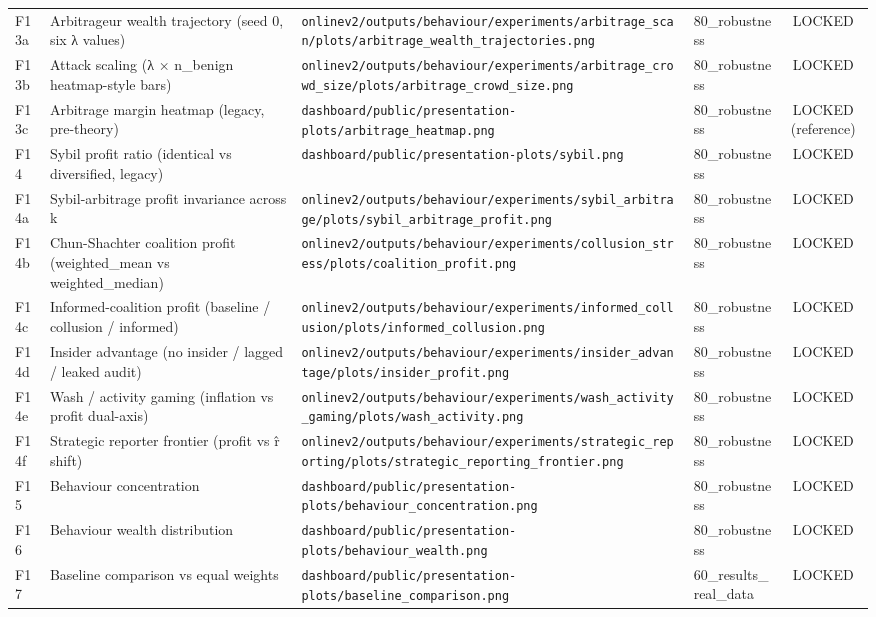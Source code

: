 \documentclass[11pt,a4paper,openany]{report}
\begin{document}
\begin{center}
\begin{tabular}{llllc}
F13a & Arbitrageur wealth trajectory (seed 0, six λ values) & \texttt{onlinev2/outputs/behaviour/experiments/arbitrage\_scan/plots/arbitrage\_wealth\_trajectories.png} & 80\_robustness & LOCKED \\
F13b & Attack scaling (λ × n\_benign heatmap-style bars) & \texttt{onlinev2/outputs/behaviour/experiments/arbitrage\_crowd\_size/plots/arbitrage\_crowd\_size.png} & 80\_robustness & LOCKED \\
F13c & Arbitrage margin heatmap (legacy, pre-theory) & \texttt{dashboard/public/presentation-plots/arbitrage\_heatmap.png} & 80\_robustness & LOCKED (reference) \\
F14 & Sybil profit ratio (identical vs diversified, legacy) & \texttt{dashboard/public/presentation-plots/sybil.png} & 80\_robustness & LOCKED \\
F14a & Sybil-arbitrage profit invariance across k & \texttt{onlinev2/outputs/behaviour/experiments/sybil\_arbitrage/plots/sybil\_arbitrage\_profit.png} & 80\_robustness & LOCKED \\
F14b & Chun-Shachter coalition profit (weighted\_mean vs weighted\_median) & \texttt{onlinev2/outputs/behaviour/experiments/collusion\_stress/plots/coalition\_profit.png} & 80\_robustness & LOCKED \\
F14c & Informed-coalition profit (baseline / collusion / informed) & \texttt{onlinev2/outputs/behaviour/experiments/informed\_collusion/plots/informed\_collusion.png} & 80\_robustness & LOCKED \\
F14d & Insider advantage (no insider / lagged / leaked audit) & \texttt{onlinev2/outputs/behaviour/experiments/insider\_advantage/plots/insider\_profit.png} & 80\_robustness & LOCKED \\
F14e & Wash / activity gaming (inflation vs profit dual-axis) & \texttt{onlinev2/outputs/behaviour/experiments/wash\_activity\_gaming/plots/wash\_activity.png} & 80\_robustness & LOCKED \\
F14f & Strategic reporter frontier (profit vs r̂ shift) & \texttt{onlinev2/outputs/behaviour/experiments/strategic\_reporting/plots/strategic\_reporting\_frontier.png} & 80\_robustness & LOCKED \\
F15 & Behaviour concentration & \texttt{dashboard/public/presentation-plots/behaviour\_concentration.png} & 80\_robustness & LOCKED \\
F16 & Behaviour wealth distribution & \texttt{dashboard/public/presentation-plots/behaviour\_wealth.png} & 80\_robustness & LOCKED \\
F17 & Baseline comparison vs equal weights & \texttt{dashboard/public/presentation-plots/baseline\_comparison.png} & 60\_results\_real\_data & LOCKED \\

\end{tabular}
\end{center}
\end{document}
